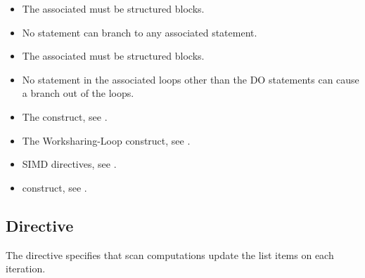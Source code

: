 \begin{ccppspecific}
\begin{itemize}
\item The associated  must be structured blocks.
\item No statement can branch to any associated  statement.
\end{itemize}
\end{ccppspecific}

\begin{fortranspecific}
\begin{itemize}
\item The associated  must be structured blocks.
\item No statement in the associated loops other than the DO statements can cause
      a branch out of the loops.
\end{itemize}
\end{fortranspecific}

\crossreferences
\begin{itemize}
\item The  construct, see .

\item The Worksharing-Loop construct, see .

\item SIMD directives, see .

\item {} construct, see .
\end{itemize}



\subsection{ Directive}
\label{subsec:scan Directive}

\summary
The  directive specifies that scan computations update
the list items on each iteration.


